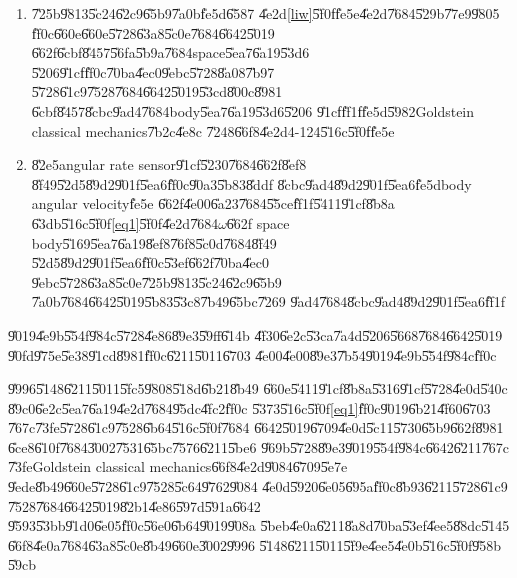 \documentclass[12pt,a4paper]{article}
\begin{document}
\begin{enumerate}
\item \U{725b}\U{9813}\U{5c24}\U{62c9}\U{65b9}\U{7a0b}\U{fe5d}\U{6587}%
\U{4e2d}\ref{liw}\U{5f0f}\U{fe5e}\U{4e2d}\U{7684}\U{529b}\U{77e9}\U{9805}%
\U{ff0c}\U{660e}\U{660e}\U{5728}\U{63a8}\U{5c0e}\U{7684}\U{6642}\U{5019}%
\U{662f}\U{6cbf}\U{8457}\U{56fa}\U{5b9a}\U{7684}space\U{5ea7}\U{6a19}\U{53d6}%
\U{5206}\U{91cf}\U{ff0c}\U{70ba}\U{4ec0}\U{9ebc}\U{5728}\U{8a08}\U{7b97}%
\U{5728}\U{61c9}\U{7528}\U{7684}\U{6642}\U{5019}\U{53cd}\U{800c}\U{8981}%
\U{6cbf}\U{8457}\U{8cbc}\U{9ad4}\U{7684}body\U{5ea7}\U{6a19}\U{53d6}\U{5206}%
\U{91cf}\U{ff1f}\U{fe5d}\U{5982}Goldstein classical mechanics\U{7b2c}\U{4e8c}%
\U{7248}\U{66f8}\U{4e2d}4-124\U{516c}\U{5f0f}\U{fe5e}

\item \U{82e5}angular rate sensor\U{91cf}\U{5230}\U{7684}\U{662f}\U{8ef8}%
\U{8f49}\U{52d5}\U{89d2}\U{901f}\U{5ea6}\U{ff0c}\U{90a3}\U{5b83}\U{8ddf}%
\U{8cbc}\U{9ad4}\U{89d2}\U{901f}\U{5ea6}\U{fe5d}body angular velocity\U{fe5e}%
\U{662f}\U{4e00}\U{6a23}\U{7684}\U{55ce}\U{ff1f}\U{5411}\U{91cf}\U{8b8a}%
\U{63db}\U{516c}\U{5f0f}\ref{eq1}\U{5f0f}\U{4e2d}\U{7684}$\omega $\U{662f}%
space body\U{5169}\U{5ea7}\U{6a19}\U{8ef8}\U{76f8}\U{5c0d}\U{7684}\U{8f49}%
\U{52d5}\U{89d2}\U{901f}\U{5ea6}\U{ff0c}\U{53ef}\U{662f}\U{70ba}\U{4ec0}%
\U{9ebc}\U{5728}\U{63a8}\U{5c0e}\U{725b}\U{9813}\U{5c24}\U{62c9}\U{65b9}%
\U{7a0b}\U{7684}\U{6642}\U{5019}\U{5b83}\U{53c8}\U{7b49}\U{65bc}\U{7269}%
\U{9ad4}\U{7684}\U{8cbc}\U{9ad4}\U{89d2}\U{901f}\U{5ea6}\U{ff1f}
\end{enumerate}

\U{9019}\U{4e9b}\U{554f}\U{984c}\U{5728}\U{4e86}\U{89e3}\U{59ff}\U{614b}%
\U{4f30}\U{6e2c}\U{53ca}\U{7a4d}\U{5206}\U{5668}\U{7684}\U{6642}\U{5019}%
\U{90fd}\U{975e}\U{5e38}\U{91cd}\U{8981}\U{ff0c}\U{6211}\U{5011}\U{6703}%
\U{4e00}\U{4e00}\U{89e3}\U{7b54}\U{9019}\U{4e9b}\U{554f}\U{984c}\U{ff0c}

\bigskip

\U{9996}\U{5148}\U{6211}\U{5011}\U{5fc5}\U{9808}\U{518d}\U{6b21}\U{8b49}%
\U{660e}\U{5411}\U{91cf}\U{8b8a}\U{5316}\U{91cf}\U{5728}\U{4e0d}\U{540c}%
\U{89c0}\U{6e2c}\U{5ea7}\U{6a19}\U{4e2d}\U{7684}\U{95dc}\U{4fc2}\U{ff0c}%
\U{5373}\U{516c}\U{5f0f}\ref{eq1}\U{ff0c}\U{9019}\U{6b21}\U{4f60}\U{6703}%
\U{767c}\U{73fe}\U{5728}\U{61c9}\U{7528}\U{6b64}\U{516c}\U{5f0f}\U{7684}%
\U{6642}\U{5019}\U{6709}\U{4e0d}\U{5c11}\U{5730}\U{65b9}\U{662f}\U{8981}%
\U{6ce8}\U{610f}\U{7684}\U{3002}\U{7531}\U{65bc}\U{7576}\U{6211}\U{5be6}%
\U{969b}\U{5728}\U{89e3}\U{9019}\U{554f}\U{984c}\U{6642}\U{6211}\U{767c}%
\U{73fe}Goldstein classical mechanics\U{66f8}\U{4e2d}\U{9084}\U{6709}\U{5e7e}%
\U{9ede}\U{8b49}\U{660e}\U{5728}\U{61c9}\U{7528}\U{5c64}\U{9762}\U{9084}%
\U{4e0d}\U{5920}\U{6e05}\U{695a}\U{ff0c}\U{8b93}\U{6211}\U{5728}\U{61c9}%
\U{7528}\U{7684}\U{6642}\U{5019}\U{82b1}\U{4e86}\U{597d}\U{591a}\U{6642}%
\U{9593}\U{53bb}\U{91d0}\U{6e05}\U{ff0c}\U{56e0}\U{6b64}\U{9019}\U{908a}%
\U{5beb}\U{4e0a}\U{6211}\U{8a8d}\U{70ba}\U{53ef}\U{4ee5}\U{88dc}\U{5145}%
\U{66f8}\U{4e0a}\U{7684}\U{63a8}\U{5c0e}\U{8b49}\U{660e}\U{3002}\U{9996}%
\U{5148}\U{6211}\U{5011}\U{5f9e}\U{4ee5}\U{4e0b}\U{516c}\U{5f0f}\U{958b}%
\U{59cb}
\end{document}

